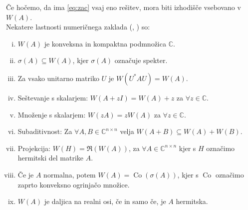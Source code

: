 \documentclass[12pt,a4paper]{amsart}
\theoremstyle{definition}
\theoremstyle{plain}
\newcommand{\Co}{\operatorname{Co}} %
\newcommand{\C}{\mathbb C}
\begin{document}
Če hočemo, da ima \eqref{eq:zac} vsaj eno rešitev, mora biti izhodišče vsebovano v $W(A)$. \\

Nekatere lastnosti numeričnega zaklada (\cite{num}, \cite{zaloga}) so:
\begin{enumerate}[(i)]
\item \label{l1} $W(A)$ je konveksna in kompaktna podmnožica $\C$.
\item \label{l2} $\sigma(A)\subseteq W(A)$, kjer $\sigma(A)$ označuje spekter.
\item \label{l3} Za vsako unitarno matriko $U$ je $W(U^\ast AU)=W(A).$
\item \label{l4} Seštevanje s skalarjem: $W(A+zI)=W(A)+z$ za $\forall z \in \C$.
\item \label{l5} Množenje s skalarjem: $W(zA)=zW(A)$ za $\forall z \in \C$.
\item \label{l6} Subaditivnost: Za $\forall A, B \in \C^{n\times n}$ velja $W(A+B) \subseteq W(A) +W(B).$
\item \label{l7} Projekcija: $W(H)= \Re( W(A))$, za $\forall A\in \C^{n\times n}$ kjer s $H$ označimo hermitski del matrike $A$.
\item \label{l8} Če je $A$ normalna, potem $W(A)=\Co(\sigma(A))$, kjer s $\Co$ označimo zaprto konveksno ogrinjačo množice.
\item \label{l9} $W(A)$ je daljica na realni osi, če in samo če, je $A$ hermitska.
\end{enumerate}
\end{document}
